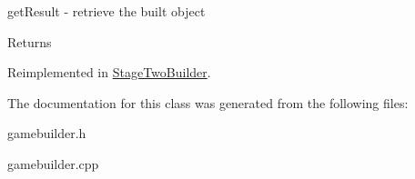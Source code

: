 get\+Result -\/ retrieve the built object 

\begin{DoxyReturn}{Returns}

\end{DoxyReturn}


Reimplemented in \mbox{\hyperlink{class_stage_two_builder_ac40c00c49b18b7c4f83f4474a8cd9c73}{Stage\+Two\+Builder}}.



The documentation for this class was generated from the following files\+:\begin{DoxyCompactItemize}
\item 
gamebuilder.\+h\item 
gamebuilder.\+cpp\end{DoxyCompactItemize}
